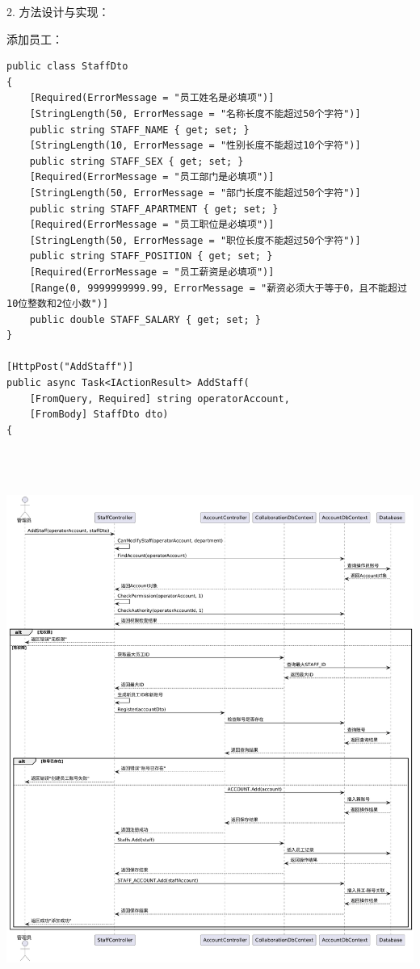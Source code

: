 \documentclass[]{article}
\begin{document}
2. 方法设计与实现：

添加员工：
\begin{verbatim}
public class StaffDto
{
    [Required(ErrorMessage = "员工姓名是必填项")]
    [StringLength(50, ErrorMessage = "名称长度不能超过50个字符")]
    public string STAFF_NAME { get; set; }
    [StringLength(10, ErrorMessage = "性别长度不能超过10个字符")]
    public string STAFF_SEX { get; set; }
    [Required(ErrorMessage = "员工部门是必填项")]
    [StringLength(50, ErrorMessage = "部门长度不能超过50个字符")]
    public string STAFF_APARTMENT { get; set; }
    [Required(ErrorMessage = "员工职位是必填项")]
    [StringLength(50, ErrorMessage = "职位长度不能超过50个字符")]
    public string STAFF_POSITION { get; set; }
    [Required(ErrorMessage = "员工薪资是必填项")]
    [Range(0, 9999999999.99, ErrorMessage = "薪资必须大于等于0，且不能超过10位整数和2位小数")]
    public double STAFF_SALARY { get; set; }
}

[HttpPost("AddStaff")]
public async Task<IActionResult> AddStaff(
    [FromQuery, Required] string operatorAccount,
    [FromBody] StaffDto dto)
{
\end{verbatim}

\includegraphics[width=6.27778in,height=7.20903in]{media/media/image15.png}
\end{document}

